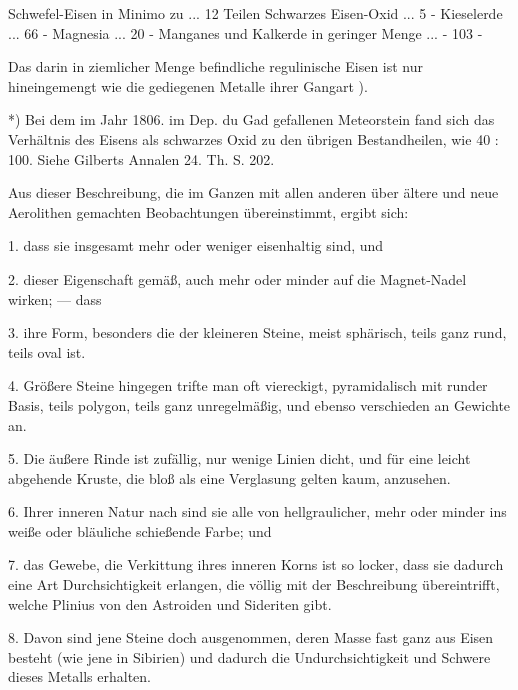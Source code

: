 \documentclass[a4paper, 11pt, oneside, polutonikogreek, german]{article}
\begin{document}
Schwefel-Eisen in Minimo zu ... 12 Teilen
Schwarzes Eisen-Oxid ... 5 -
Kieselerde ... 66 -
Magnesia ... 20 -
Manganes und Kalkerde in geringer Menge ... -
103 -

Das darin in ziemlicher Menge befindliche regulinische Eisen ist nur hineingemengt wie die gediegenen Metalle ihrer Gangart ).

*) Bei dem im Jahr 1806. im Dep. du Gad gefallenen Meteorstein fand sich das Verhältnis des Eisens als schwarzes Oxid zu den übrigen Bestandheilen, wie 40 : 100. Siehe Gilberts Annalen 24. Th. S. 202.

Aus dieser Beschreibung, die im Ganzen mit allen anderen über ältere und neue Aerolithen gemachten Beobachtungen übereinstimmt, ergibt sich:

1. dass sie insgesamt mehr oder weniger eisenhaltig sind, und

2. dieser Eigenschaft gemäß, auch mehr oder minder auf die Magnet-Nadel wirken; --- dass

3. ihre Form, besonders die der kleineren Steine, meist sphärisch, teils ganz rund, teils oval ist.

4. Größere Steine hingegen trifte man oft viereckigt, pyramidalisch mit runder Basis, teils polygon, teils ganz unregelmäßig, und ebenso verschieden an Gewichte an.

5. Die äußere Rinde ist zufällig, nur wenige Linien dicht, und für eine leicht abgehende Kruste, die bloß als eine Verglasung gelten kaum, anzusehen.

6. Ihrer inneren Natur nach sind sie alle von hellgraulicher, mehr oder minder ins weiße oder bläuliche schießende Farbe; und

7. das Gewebe, die Verkittung ihres inneren Korns ist so locker, dass sie dadurch eine Art Durchsichtigkeit erlangen, die völlig mit der Beschreibung übereintrifft, welche Plinius von den Astroiden und Sideriten gibt.

8. Davon sind jene Steine doch ausgenommen, deren Masse fast ganz aus Eisen besteht (wie jene in Sibirien) und dadurch die Undurchsichtigkeit und Schwere dieses Metalls erhalten.
\end{document}
